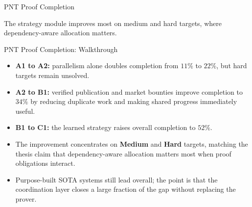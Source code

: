 \documentclass[10pt,aspectratio=169]{beamer}
\begin{document}
\begin{frame}{PNT Proof Completion}
\scriptsize
\centering
{}

\vspace{0.8em}
\small
The strategy module improves most on medium and hard targets, where dependency-aware allocation matters.
\end{frame}

\begin{frame}{PNT Proof Completion: Walkthrough}
\small
\begin{itemize}
  \item \textbf{A1 to A2:} parallelism alone doubles completion from $11\%$ to $22\%$, but hard targets remain unsolved.
  \item \textbf{A2 to B1:} verified publication and market bounties improve completion to $34\%$ by reducing duplicate work and making shared progress immediately useful.
  \item \textbf{B1 to C1:} the learned strategy raises overall completion to $52\%$.
  \item The improvement concentrates on \textbf{Medium} and \textbf{Hard} targets, matching the thesis claim that dependency-aware allocation matters most when proof obligations interact.
  \item Purpose-built SOTA systems still lead overall; the point is that the coordination layer closes a large fraction of the gap without replacing the prover.
\end{itemize}
\end{frame}
\end{document}
